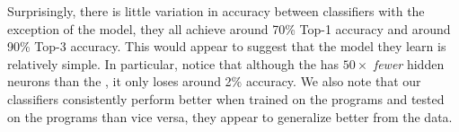 Surprisingly, there is little variation in accuracy between classifiers
with the exception of the \linear model, they all achieve around 70\%
Top-1 accuracy and around 90\% Top-3 accuracy.
%
This would appear to suggest that the model they learn is relatively
simple.
%
In particular, notice that although the \hiddenT has $50\times$ \emph{fewer}
hidden neurons than the \hiddenFH, it only loses around 2\% accuracy.
%
We also note that our classifiers consistently perform better when
trained on the \FALL programs and tested on the \SPRING programs than
vice versa, they appear to generalize better from the \FALL data.

